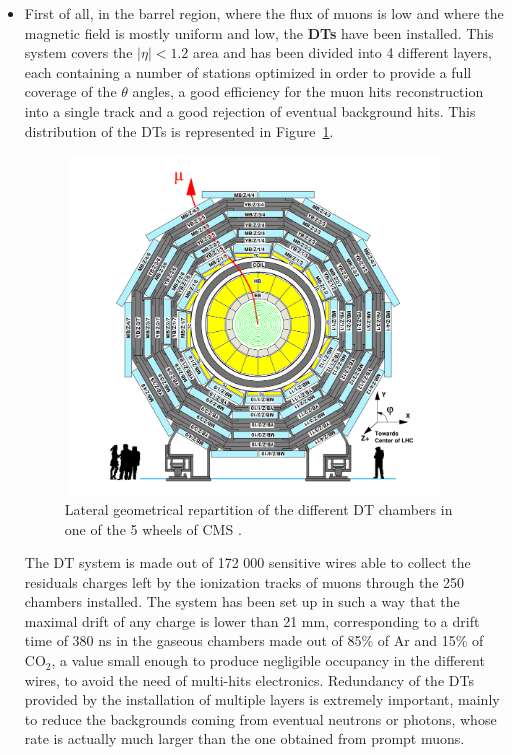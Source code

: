\documentclass[a4paper, 10pt, openright]{report}
\begin{document}
\begin{itemize}
\item First of all, in the barrel region, where the flux of muons is low and where the magnetic field is mostly uniform and low, the \textbf{\acfp{DT}} have been installed. This system covers the $|\eta| < 1.2$ area and has been divided into 4 different layers, each containing a number of stations optimized in order to provide a full coverage of the $\theta$ angles, a good efficiency for the muon hits reconstruction into a single track and a good rejection of eventual background hits. This distribution of the \acp{DT} is represented in Figure~\ref{fig:CMSDT}.

\begin{figure}[htbp]
\begin{center}
\includegraphics[width=10cm, height=9cm]{figs/CMSDT.png}
\caption{Lateral geometrical repartition of the different \ac{DT} chambers in one of the 5 wheels of \ac{CMS} \cite{CMSDescription}.}
\label{fig:CMSDT}
\end{center}
\end{figure}

The \ac{DT} system is made out of 172 000 sensitive wires able to collect the residuals charges left by the ionization tracks of muons through the 250 chambers installed. The system has been set up in such a way that the maximal drift of any charge is lower than 21 mm, corresponding to a drift time of 380 ns in the gaseous chambers made out of 85\% of Ar and 15\% of CO$_2$, a value small enough to produce negligible occupancy in the different wires, to avoid the need of multi-hits electronics. Redundancy of the \acp{DT} provided by the installation of multiple layers is extremely important, mainly to reduce the backgrounds coming from eventual neutrons or photons, whose rate is actually much larger than the one obtained from prompt muons.


\end{itemize}
\end{document}
